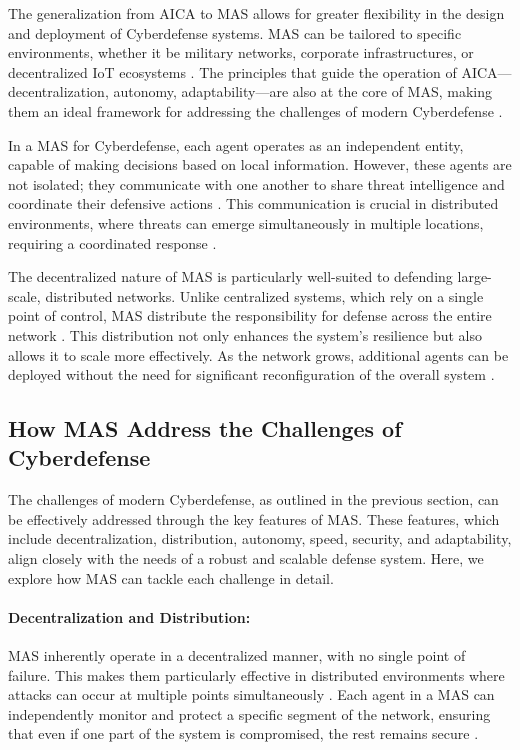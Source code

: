 The generalization from AICA to MAS allows for greater flexibility in the design and deployment of Cyberdefense systems. MAS can be tailored to specific environments, whether it be military networks, corporate infrastructures, or decentralized IoT ecosystems \cite{kott2023autonomous}. The principles that guide the operation of AICA—decentralization, autonomy, adaptability—are also at the core of MAS, making them an ideal framework for addressing the challenges of modern Cyberdefense \cite{kolias2011swarm}.

In a MAS for Cyberdefense, each agent operates as an independent entity, capable of making decisions based on local information. However, these agents are not isolated; they communicate with one another to share threat intelligence and coordinate their defensive actions \cite{kolias2016swarm}. This communication is crucial in distributed environments, where threats can emerge simultaneously in multiple locations, requiring a coordinated response \cite{bace2001intrusion}.

The decentralized nature of MAS is particularly well-suited to defending large-scale, distributed networks. Unlike centralized systems, which rely on a single point of control, MAS distribute the responsibility for defense across the entire network \cite{shamshirband2014cooperative}. This distribution not only enhances the system's resilience but also allows it to scale more effectively. As the network grows, additional agents can be deployed without the need for significant reconfiguration of the overall system \cite{shamshirband2018computational}.

\subsection{How MAS Address the Challenges of Cyberdefense}

The challenges of modern Cyberdefense, as outlined in the previous section, can be effectively addressed through the key features of MAS. These features, which include decentralization, distribution, autonomy, speed, security, and adaptability, align closely with the needs of a robust and scalable defense system. Here, we explore how MAS can tackle each challenge in detail.

\paragraph{Decentralization and Distribution:}
MAS inherently operate in a decentralized manner, with no single point of failure. This makes them particularly effective in distributed environments where attacks can occur at multiple points simultaneously \cite{kolias2016swarm}. Each agent in a MAS can independently monitor and protect a specific segment of the network, ensuring that even if one part of the system is compromised, the rest remains secure \cite{shakarian2015cyber}.

